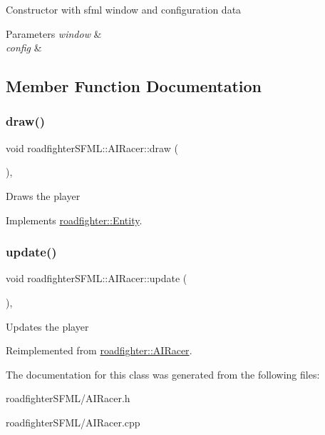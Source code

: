 Constructor with sfml window and configuration data 
\begin{DoxyParams}{Parameters}
{\em window} & \\
\hline
{\em config} & \\
\hline
\end{DoxyParams}


\subsection{Member Function Documentation}
\mbox{\label{classroadfighterSFML_1_1AIRacer_a50d966c9d59e09a155d69e2c2296fb4e}} 
\subsubsection{\texorpdfstring{draw()}{draw()}}
{\footnotesize\ttfamily void roadfighter\+S\+F\+M\+L\+::\+A\+I\+Racer\+::draw (\begin{DoxyParamCaption}{ }\end{DoxyParamCaption})\hspace{0.3cm}{\ttfamily [override]}, {\ttfamily [virtual]}}

Draws the player 

Implements \hyperlink{classroadfighter_1_1Entity_ac516f8005f969ad5a86c252e5a3640ee}{roadfighter\+::\+Entity}.

\mbox{\label{classroadfighterSFML_1_1AIRacer_aaecd91860a2ac61ef671000e311b7860}} 
\subsubsection{\texorpdfstring{update()}{update()}}
{\footnotesize\ttfamily void roadfighter\+S\+F\+M\+L\+::\+A\+I\+Racer\+::update (\begin{DoxyParamCaption}{ }\end{DoxyParamCaption})\hspace{0.3cm}{\ttfamily [override]}, {\ttfamily [virtual]}}

Updates the player 

Reimplemented from \hyperlink{classroadfighter_1_1AIRacer_a92afd3d1bfcd290d3b012cbfe44d5a77}{roadfighter\+::\+A\+I\+Racer}.



The documentation for this class was generated from the following files\+:\begin{DoxyCompactItemize}
\item 
roadfighter\+S\+F\+M\+L/A\+I\+Racer.\+h\item 
roadfighter\+S\+F\+M\+L/A\+I\+Racer.\+cpp\end{DoxyCompactItemize}

